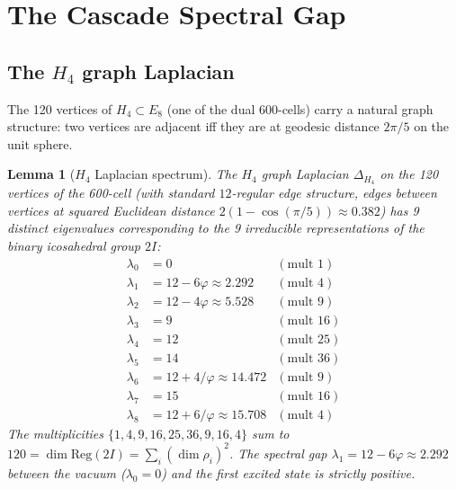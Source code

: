 \documentclass[11pt, a4paper]{amsart}
\newtheorem{lemma}[theorem]{Lemma}
\theoremstyle{definition}
\begin{document}
\section{The Cascade Spectral Gap}\label{sec:gap}

\subsection{The $H_4$ graph Laplacian}

The 120 vertices of $H_4 \subset E_8$ (one of the dual 600-cells)
carry a natural graph structure: two vertices are adjacent iff
they are at geodesic distance $2\pi/5$ on the unit sphere.

\begin{lemma}[$H_4$ Laplacian spectrum]\label{lem:H4spec}
The $H_4$ graph Laplacian $\Delta_{H_4}$ on the 120 vertices of the
600-cell (with standard $12$-regular edge structure, edges between
vertices at squared Euclidean distance $2(1 - \cos(\pi/5)) \approx 0.382$)
has 9 distinct eigenvalues corresponding to the 9 irreducible
representations of the binary icosahedral group $2I$:
\begin{align*}
\lambda_0 &= 0               & (\text{mult } 1) \\
\lambda_1 &= 12 - 6\varphi \approx 2.292   & (\text{mult } 4) \\
\lambda_2 &= 12 - 4\varphi \approx 5.528   & (\text{mult } 9) \\
\lambda_3 &= 9                             & (\text{mult } 16) \\
\lambda_4 &= 12                            & (\text{mult } 25) \\
\lambda_5 &= 14                            & (\text{mult } 36) \\
\lambda_6 &= 12 + 4/\varphi \approx 14.472 & (\text{mult } 9) \\
\lambda_7 &= 15                            & (\text{mult } 16) \\
\lambda_8 &= 12 + 6/\varphi \approx 15.708 & (\text{mult } 4)
\end{align*}
The multiplicities $\{1, 4, 9, 16, 25, 36, 9, 16, 4\}$ sum to $120
= \dim \mathrm{Reg}(2I) = \sum_i (\dim \rho_i)^2$.
The spectral gap $\lambda_1 = 12 - 6\varphi \approx 2.292$
between the vacuum ($\lambda_0 = 0$) and the first excited state is
strictly positive.
\end{lemma}
\end{document}
